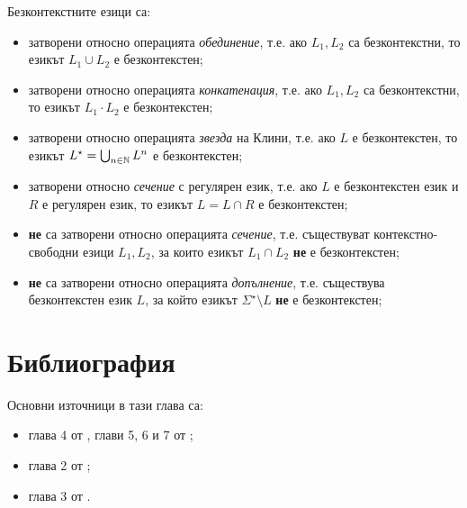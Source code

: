 Безконтекстните езици са:
\begin{itemize}
\item 
  затворени относно операцията {\em обединение}, т.е.
  ако $L_1, L_2$ са безконтекстни, то езикът $L_1 \cup L_2$ е безконтекстен; 
\item
  затворени относно операцията {\em конкатенация}, т.е.
  ако $L_1, L_2$ са безконтекстни, то езикът $L_1 \cdot L_2$ е безконтекстен; 
\item
  затворени относно операцията {\em звезда} на Клини, т.е.
  ако $L$ е безконтекстен, то езикът $L^\star = \bigcup_{n\in\mathbb{N}} L^n$ е безконтекстен; 
\item
  затворени относно {\em сечение} с регулярен език, т.е.
  ако $L$ е безконтекстен език и $R$ е регулярен език, то езикът $L = L \cap R$ е безконтекстен; 
\item
  {\bf не} са затворени относно операцията {\em сечение}, т.е.
  съществуват контекстно-свободни езици $L_1, L_2$, за които езикът $L_1 \cap L_2$ {\bf не} е безконтекстен; 
\item
  {\bf не} са затворени относно операцията {\em допълнение}, т.е.
  съществува безконтекстен език $L$, за който езикът $\Sigma^\star\setminus L$ {\bf не} е безконтекстен; 
\end{itemize}

\section*{Библиография}

Основни източници в тази глава са:
\begin{itemize}
\item 
  глава 4 от \cite{hopcroft1}, глави 5, 6 и 7 от \cite{hopcroft2};
\item
  глава 2 от \cite{sipser};
\item
  глава 3 от \cite{papadimitriou}.
\end{itemize}


